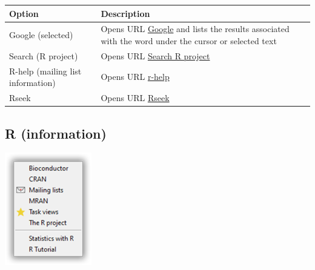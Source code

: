 \begin{scriptsize}
  \begin{tabularx}{\textwidth}{>{\hsize=0.5\hsize}X>{\hsize=0.7\hsize}X}\\
    \hline
    \textbf{Option} & \textbf{Description} \\
    \hline
    Google (selected) & Opens URL \href{http://www.google.com/webhp?domains=r-project.org\&sitesearch=r-project.org\&btnG=Google+Search}{Google} and lists the results associated with the word under the cursor or selected text \\
    Search (R project) & Opens URL \href{https://search.r-project.org/}{Search R project} \\
    R-help (mailing list information) & Opens URL \href{http://www.mail-archive.com/r-help@stat.math.ethz.ch/info.html}{r-help} \\
    Rseek & Opens URL \href{http://www.rseek.org/}{Rseek} \\
    \hline
  \end{tabularx}
\end{scriptsize}


\hypertarget{menu_web_rinformation}{}
\subsection{R (information)}

\includegraphics[scale=0.50]{./res/menu_web_rinformation.png}\\

